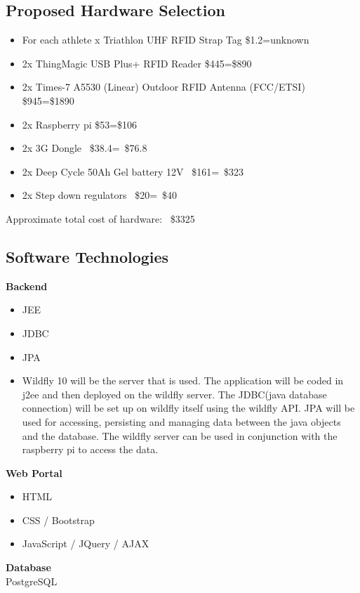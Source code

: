 \documentclass{article}
\begin{document}
\subsection{Proposed Hardware Selection}
 \begin{itemize} 
 	\item For each athlete x Triathlon UHF RFID Strap Tag \quad \$1.2=unknown
 	\item 2x ThingMagic USB Plus+ RFID Reader \quad \$445=\$890
 	\item 2x Times-7 A5530 (Linear) Outdoor RFID Antenna (FCC/ETSI) \quad \$945=\$1890
    \item 2x Raspberry pi \quad \$53=\$106
    \item 2x 3G Dongle ~\$38.4=~\$76.8
    \item 2x Deep Cycle 50Ah Gel battery 12V ~\$161=~\$323
    \item 2x Step down regulators ~\$20=~\$40
 \end{itemize}
 
 Approximate total cost of hardware: \quad  ~\$3325

\subsection{Software Technologies}
\textbf{Backend}
\begin{itemize}
	\item JEE
	\item JDBC
	\item JPA
	\item Wildfly 10 will be the server that is used. The application will be coded in j2ee and then deployed on the wildfly server. The JDBC(java database connection) will be set up on wildfly itself using the wildfly API. JPA will be used for accessing, persisting and managing data between the java objects and the database. The wildfly server can be used in conjunction with  the raspberry pi to access the data. 
\end{itemize}
\textbf{Web Portal} 
\begin{itemize}
	\item HTML
	\item CSS / Bootstrap
	\item JavaScript / JQuery / AJAX
\end{itemize}
\textbf{Database} \\
PostgreSQL
\end{document}
